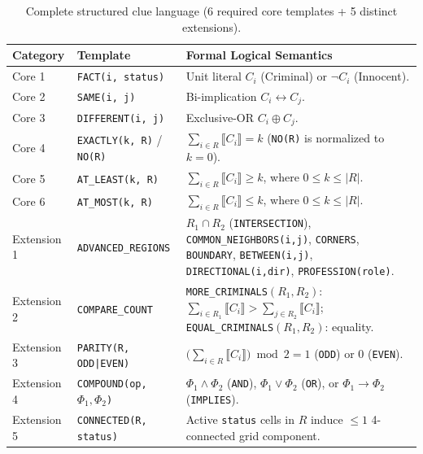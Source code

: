 \documentclass[11pt,a4paper]{article}
\begin{document}
\begin{table}[h!]
\centering
\small
\begin{tabular}{@{}llp{9.2cm}@{}}
\toprule
\textbf{Category} & \textbf{Template} & \textbf{Formal Logical Semantics} \\
\midrule
Core 1 & \texttt{FACT(i, status)} & Unit literal $C_i$ (Criminal) or $\neg C_i$ (Innocent). \\
Core 2 & \texttt{SAME(i, j)} & Bi-implication $C_i \leftrightarrow C_j$. \\
Core 3 & \texttt{DIFFERENT(i, j)} & Exclusive-OR $C_i \oplus C_j$. \\
Core 4 & \texttt{EXACTLY(k, R)} / \texttt{NO(R)} & $\sum_{i \in R} \llbracket C_i \rrbracket = k$ (\texttt{NO(R)} is normalized to $k = 0$). \\
Core 5 & \texttt{AT\_LEAST(k, R)} & $\sum_{i \in R} \llbracket C_i \rrbracket \ge k$, where $0 \le k \le |R|$. \\
Core 6 & \texttt{AT\_MOST(k, R)} & $\sum_{i \in R} \llbracket C_i \rrbracket \le k$, where $0 \le k \le |R|$. \\
\midrule
Extension 1 & \texttt{ADVANCED\_REGIONS} & $R_1 \cap R_2$ (\texttt{INTERSECTION}), \texttt{COMMON\_NEIGHBORS(i,j)}, \texttt{CORNERS}, \texttt{BOUNDARY}, \texttt{BETWEEN(i,j)}, \texttt{DIRECTIONAL(i,dir)}, \texttt{PROFESSION(role)}. \\
Extension 2 & \texttt{COMPARE\_COUNT} & \texttt{MORE\_CRIMINALS}$(R_1, R_2)$: $\sum_{i \in R_1} \llbracket C_i \rrbracket > \sum_{j \in R_2} \llbracket C_i \rrbracket$; \texttt{EQUAL\_CRIMINALS}$(R_1, R_2)$: equality. \\
Extension 3 & \texttt{PARITY(R, ODD|EVEN)} & $\big(\sum_{i \in R} \llbracket C_i \rrbracket\big) \bmod 2 = 1$ (\texttt{ODD}) or $0$ (\texttt{EVEN}). \\
Extension 4 & \texttt{COMPOUND(op, $\Phi_1, \Phi_2$)} & $\Phi_1 \land \Phi_2$ (\texttt{AND}), $\Phi_1 \lor \Phi_2$ (\texttt{OR}), or $\Phi_1 \to \Phi_2$ (\texttt{IMPLIES}). \\
Extension 5 & \texttt{CONNECTED(R, status)} & Active \texttt{status} cells in $R$ induce $\le 1$ 4-connected grid component. \\
\bottomrule
\end{tabular}
\caption{Complete structured clue language (6 required core templates + 5 distinct extensions).}
\end{table}
\end{document}
